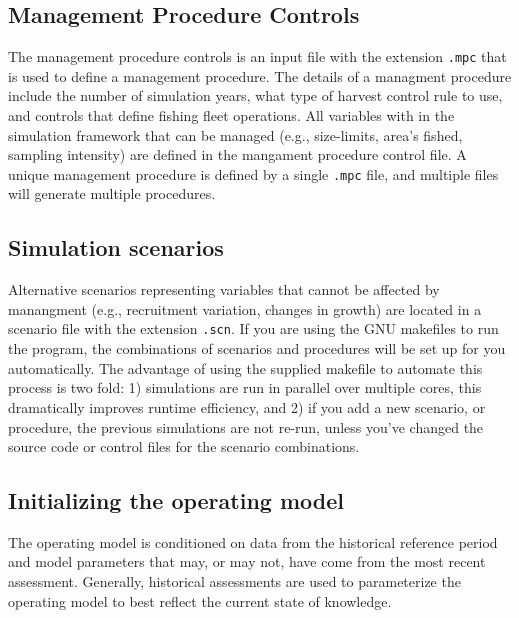 \subsection{Management Procedure Controls} %
\label{sub:management_procedure_controls}
The management procedure controls is an input file with the extension \texttt{.mpc} that is used to define a management procedure.  The details of a managment procedure include the number of simulation years, what type of harvest control rule to use, and controls that define fishing fleet operations.  All variables with in the simulation framework that can be managed (e.g., size-limits, area's fished, sampling intensity) are defined in the mangament procedure control file.  A unique management procedure is defined by a single \texttt{.mpc} file, and multiple files will generate multiple procedures.


\subsection{Simulation scenarios} %
\label{sub:simulation_scenarios}
Alternative scenarios representing variables that cannot be affected by manangment (e.g., recruitment variation, changes in growth) are located in a scenario file with the extension \texttt{.scn}.  If you are using the GNU makefiles to run the program, the combinations of scenarios and procedures will be set up for you automatically.  The advantage of using the supplied makefile to automate this process is two fold: 1) simulations are run in parallel over multiple cores, this dramatically improves runtime efficiency, and 2) if you add a new scenario, or procedure, the previous simulations are not re-run, unless you've changed the source code or control files for the scenario combinations. 

\subsection{Initializing the operating model} %
\label{sub:initializing_the_operating_model}
The operating model is conditioned on data from the historical reference period and model parameters that may, or may not, have come from the most recent assessment.  Generally, historical assessments are used to parameterize the operating model to best reflect the current state of knowledge. 


